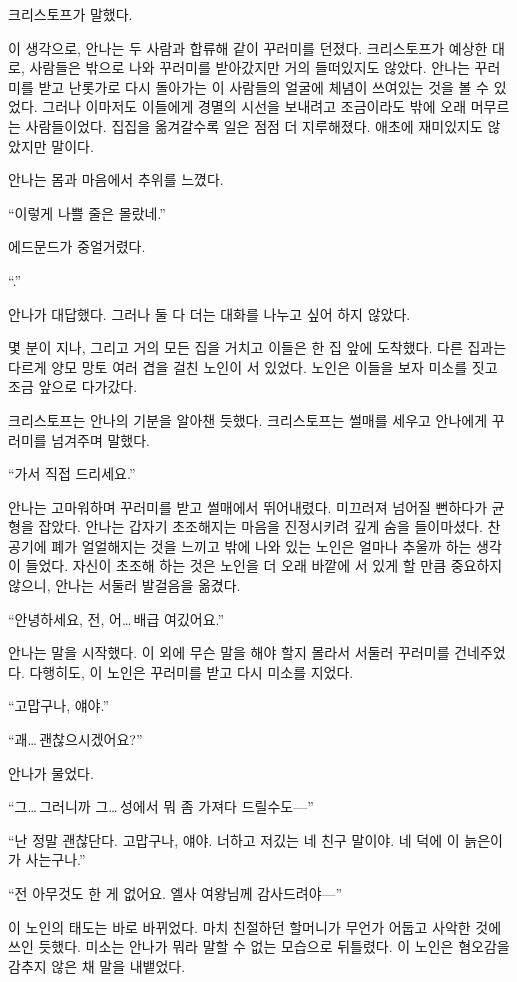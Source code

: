 크리스토프가 말했다.

이 생각으로, 안나는 두 사람과 합류해 같이 꾸러미를 던졌다. 크리스토프가 예상한 대로, 사람들은 밖으로 나와 꾸러미를 받아갔지만 거의 들떠있지도 않았다. 안나는 꾸러미를 받고 난롯가로 다시 돌아가는 이 사람들의 얼굴에 체념이 쓰여있는 것을 볼 수 있었다. 그러나 이마저도 이들에게 경멸의 시선을 보내려고 조금이라도 밖에 오래 머무르는 사람들이었다. 집집을 옮겨갈수록 일은 점점 더 지루해졌다. 애초에 재미있지도 않았지만 말이다.

안나는 몸과 마음에서 추위를 느꼈다.

``이렇게 나쁠 줄은 몰랐네.''

에드문드가 중얼거렸다.

``.''

안나가 대답했다. 그러나 둘 다 더는 대화를 나누고 싶어 하지 않았다.

몇 분이 지나, 그리고 거의 모든 집을 거치고 이들은 한 집 앞에 도착했다. 다른 집과는 다르게 양모 망토 여러 겹을 걸친 노인이 서 있었다. 노인은 이들을 보자 미소를 짓고 조금 앞으로 다가갔다.

크리스토프는 안나의 기분을 알아챈 듯했다. 크리스토프는 썰매를 세우고 안나에게 꾸러미를 넘겨주며 말했다.

``가서 직접 드리세요.''

안나는 고마워하며 꾸러미를 받고 썰매에서 뛰어내렸다. 미끄러져 넘어질 뻔하다가 균형을 잡았다. 안나는 갑자기 초조해지는 마음을 진정시키려 깊게 숨을 들이마셨다. 찬 공기에 폐가 얼얼해지는 것을 느끼고 밖에 나와 있는 노인은 얼마나 추울까 하는 생각이 들었다. 자신이 초조해 하는 것은 노인을 더 오래 바깥에 서 있게 할 만큼 중요하지 않으니, 안나는 서둘러 발걸음을 옮겼다.

``안녕하세요, 전, 어\ldots\,배급 여깄어요.''

안나는 말을 시작했다. 이 외에 무슨 말을 해야 할지 몰라서 서둘러 꾸러미를 건네주었다. 다행히도, 이 노인은 꾸러미를 받고 다시 미소를 지었다.

``고맙구나, 얘야.''

``괘\ldots\,괜찮으시겠어요?''

안나가 물었다.

``그\ldots\,그러니까 그\ldots\,성에서 뭐 좀 가져다 드릴수도—''

``난 정말 괜찮단다. 고맙구나, 얘야. 너하고 저깄는 네 친구 말이야. 네 덕에 이 늙은이가 사는구나.''

``전 아무것도 한 게 없어요. 엘사 여왕님께 감사드려야—''

이 노인의 태도는 바로 바뀌었다. 마치 친절하던 할머니가 무언가 어둡고 사악한 것에 쓰인 듯했다. 미소는 안나가 뭐라 말할 수 없는 모습으로 뒤틀렸다. 이 노인은 혐오감을 감추지 않은 채 말을 내뱉었다.

